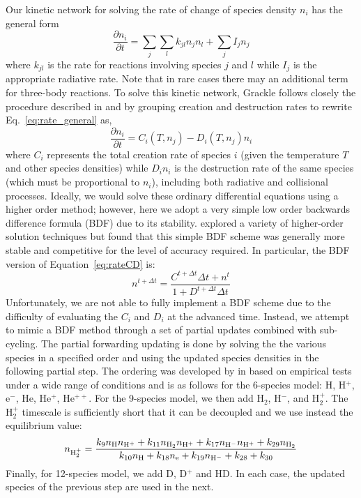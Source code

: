 Our kinetic network for solving the rate of change of species density $n_i$ has the general form
\begin{equation}
\frac{\partial n_i}{\partial t} = \sum_j \sum_l k_{jl} n_j n_l + \sum_j I_j n_j
\label{eq:rate_general}
\end{equation}
where $k_{jl}$ is the rate for reactions involving species $j$ and $l$ while $I_j$ is the appropriate radiative rate.  Note that in rare cases there may an additional term for three-body reactions.   To solve this kinetic network, Grackle follows closely the procedure described in \citet{1997NewA....2..209A} and \citet{2014ApJS..211...19B} by grouping creation and destruction rates to rewrite Eq.~\ref{eq:rate_general} as,
\begin{equation}
\frac{\partial n_i}{\partial t} = C_i(T, n_j) - D_i(T, n_j) n_i
\label{eq:rateCD}
\end{equation}
where $C_i$ represents the total creation rate of species $i$ (given the temperature $T$ and other species densities) while $D_i n_i$ is the destruction rate of the same species (which must be proportional to $n_i$), including both radiative and collisional processes.  Ideally, we would solve these ordinary differential equations using a higher order method; however, here we adopt a very simple low order backwards difference formula (BDF) due to its stability.  \citet{1997NewA....2..209A} explored a variety of higher-order solution techniques but found that this simple BDF scheme was generally more stable and competitive for the level of accuracy required.  In particular, the BDF version of Equation~\ref{eq:rateCD} is:
\begin{equation}
n^{t + \Delta t} = \frac{C^{t+\Delta t} \Delta t + n^t}{1 + D^{t+\Delta t} \Delta t}
\label{eq:rate_BDF}
\end{equation}
Unfortunately, we are not able to fully implement a BDF scheme due to the difficulty of evaluating the $C_i$ and $D_i$ at the advanced time.  Instead, we attempt to mimic a BDF method through a set of partial updates combined with sub-cycling.  The partial forwarding updating is done by solving the the various species in a specified order and using the updated species densities in the following partial step.  The ordering was developed by in \citet{1997NewA....2..209A} based on empirical tests under a wide range of conditions and is as follows for the 6-species model: H, H$^+$, e$^-$, He, He$^+$, He$^{++}$.  For the 9-species model, we then add H$_2$, H$^-$, and H$_2^+$.  The H$_2^+$ timescale is sufficiently short that it can be decoupled and we use instead the equilibrium value:
\begin{equation}
n_{ {\rm H}_2^+} = \frac{k_9 n_{\rm H} n_{\rm H^+} + k_{11} n_{\rm H_2} n_{\rm H^+} + k_{17} n_{\rm H^-} n_{\rm H^+} + k_{29} n_{\rm H_2}}
   {k_{10} n_{\rm H} + k_{18} n_{\rm e} + k_{19} n_{\rm H^-} + k_{28} + k_{30}}
\end{equation}
Finally, for 12-species model, we add D, D$^+$ and HD.  In each case, the updated species of the previous step are used in the next.  

